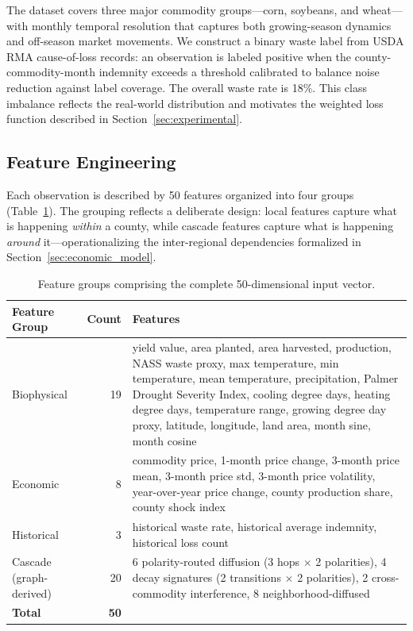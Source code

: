 \documentclass[preprint,12pt,authoryear]{elsarticle}
\begin{document}
The dataset covers three major commodity groups---corn, soybeans, and wheat---with monthly temporal resolution that captures both growing-season dynamics and off-season market movements. We construct a binary waste label from USDA RMA cause-of-loss records: an observation is labeled positive when the county-commodity-month indemnity exceeds a threshold calibrated to balance noise reduction against label coverage. The overall waste rate is 18\%. This class imbalance reflects the real-world distribution and motivates the weighted loss function described in Section~\ref{sec:experimental}.

\subsection{Feature Engineering}
\label{sec:features}

Each observation is described by 50 features organized into four groups (Table~\ref{tab:feature_groups}). The grouping reflects a deliberate design: local features capture what is happening \emph{within} a county, while cascade features capture what is happening \emph{around} it---operationalizing the inter-regional dependencies formalized in Section~\ref{sec:economic_model}.

\begin{table}[t]
\centering
\caption{Feature groups comprising the complete 50-dimensional input vector.}
\label{tab:feature_groups}
\begin{tabular}{@{}p{3.2cm}rp{8cm}@{}}
\toprule
\textbf{Feature Group} & \textbf{Count} & \textbf{Features} \\
\midrule
Biophysical & 19 & yield value, area planted, area harvested, production, NASS waste proxy, max temperature, min temperature, mean temperature, precipitation, Palmer Drought Severity Index, cooling degree days, heating degree days, temperature range, growing degree day proxy, latitude, longitude, land area, month sine, month cosine \\[4pt]
Economic & 8 & commodity price, 1-month price change, 3-month price mean, 3-month price std, 3-month price volatility, year-over-year price change, county production share, county shock index \\[4pt]
Historical & 3 & historical waste rate, historical average indemnity, historical loss count \\[4pt]
Cascade (graph-derived) & 20 & 6 polarity-routed diffusion (3 hops $\times$ 2 polarities), 4 decay signatures (2 transitions $\times$ 2 polarities), 2 cross-commodity interference, 8 neighborhood-diffused \\
\midrule
\textbf{Total} & \textbf{50} & \\
\bottomrule
\end{tabular}
\end{table}
\end{document}
